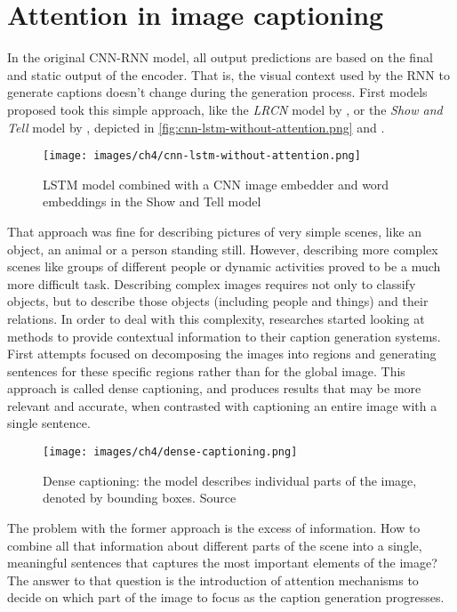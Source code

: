 \section{Attention in image captioning}


In the original CNN-RNN model, all output predictions are based on the final and static output of the encoder. That is, the visual context used by the RNN to generate captions doesn't change during the generation process. First models proposed took this simple approach, like the \textit{LRCN} model by \citet{Donahue2015}, or the \textit{Show and Tell} model by \citet{Vinyals2015}, depicted in \cref{fig:cnn-lstm-without-attention.png} and .

\begin{figure}[hpt]
	\centering
	\texttt{[image: images/ch4/cnn-lstm-without-attention.png]}
	\caption{LSTM model combined with a CNN image embedder and word embeddings in the Show and Tell model \citep{Vinyals2015}}
	\label{fig:rnn-enco-deco}
\end{figure}

That approach was fine for describing pictures of very simple scenes, like an object, an animal or a person standing still. However, describing more complex scenes like groups of different people or dynamic activities proved to be a much more difficult task. Describing complex images requires not only to classify objects, but to describe those objects (including people and things) and their relations. In order to deal with this complexity, researches started looking at methods to provide contextual information to their caption generation systems. First attempts focused on decomposing the images into regions and generating sentences for these specific regions rather than for the global image. This approach is called dense captioning, and produces results that may be more relevant and accurate, when contrasted with captioning an entire image with a single sentence.

\begin{figure}[hpt]
	\centering
	\texttt{[image: images/ch4/dense-captioning.png]}
	\caption{Dense captioning: the model describes individual parts of the image, denoted by bounding boxes. Source \citep{Johnson2015}}
	\label{fig:rnn-enco-deco}
\end{figure}

The problem with the former approach is the excess of information. How to combine all that information about different parts of the scene into a single, meaningful sentences that captures the most important elements of the image? The answer to that question is the introduction of attention mechanisms to decide on which part of the image to focus as the caption generation progresses.

